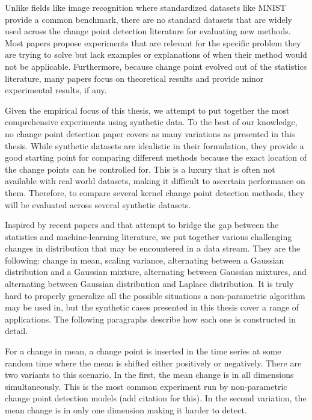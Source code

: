 Unlike fields like image recognition where standardized datasets like MNIST provide a common benchmark, there are no standard datasets that are widely used across the change point detection literature for evaluating new methods. Most papers propose experiments that are relevant for the specific problem they are trying to solve  but lack examples or explanations of when their method would not be applicable.  Furthermore, because change point evolved out of the statistics literature, many papers focus on theoretical results and provide minor experimental results, if any.

Given the empirical focus of this thesis, we attempt to put together the most comprehensive experiments using synthetic data. To the best of our knowledge, no change point detection paper covers as many variations as presented in this thesis. While synthetic datasets are idealistic in their formulation, they provide a good starting point for comparing different methods because the exact location of the change points can be controlled for. This is a luxury that is often not available with real world datasets, making it difficult to ascertain performance on them. Therefore, to compare several kernel change point detection methods, they will be evaluated across several synthetic datasets.

Inspired by recent papers \cite{chang2019kernel} and \cite{flynn2019change} that attempt to bridge the gap between the statistics and machine-learning literature, we put together various challenging changes in distribution that may be encountered in a data stream. They are the following: change in mean, scaling variance, alternating between a Gaussian distribution and a Gaussian mixture, alternating between Gaussian mixtures, and alternating between Gaussian distribution and Laplace distribution. It is truly hard to properly generalize all the possible situations a non-parametric algorithm may be used in, but the synthetic cases presented in this thesis cover a range of applications. The following paragraphs describe how each one is constructed in detail.

For a change in mean, a change point is inserted in the time series at some random time where the mean is shifted either positively or negatively. There are two variants to this scenario. In the first, the mean change is in all dimensions simultaneously. This is the most common experiment run by non-parametric change point detection models (add citation for this). In the second variation, the mean change is in only one dimension making it harder to detect. 

